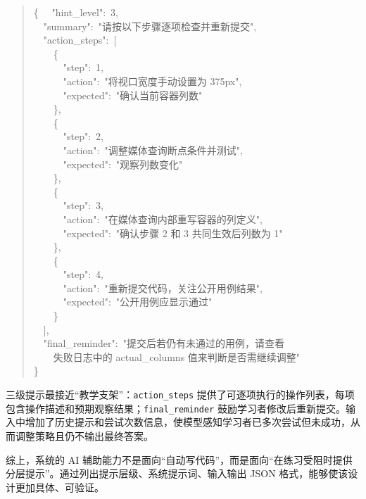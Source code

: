 \begin{appendices}
\begin{quote}\small\ttfamily
\{
\ \ "hint\_level":\ 3,\\
\ \ "summary":\ "请按以下步骤逐项检查并重新提交",\\
\ \ "action\_steps":\ [\\
\ \ \ \ \{\\
\ \ \ \ \ \ "step":\ 1,\\
\ \ \ \ \ \ "action":\ "将视口宽度手动设置为 375px",\\
\ \ \ \ \ \ "expected":\ "确认当前容器列数"\\
\ \ \ \ \},\\
\ \ \ \ \{\\
\ \ \ \ \ \ "step":\ 2,\\
\ \ \ \ \ \ "action":\ "调整媒体查询断点条件并测试",\\
\ \ \ \ \ \ "expected":\ "观察列数变化"\\
\ \ \ \ \},\\
\ \ \ \ \{\\
\ \ \ \ \ \ "step":\ 3,\\
\ \ \ \ \ \ "action":\ "在媒体查询内部重写容器的列定义",\\
\ \ \ \ \ \ "expected":\ "确认步骤 2 和 3 共同生效后列数为 1"\\
\ \ \ \ \},\\
\ \ \ \ \{\\
\ \ \ \ \ \ "step":\ 4,\\
\ \ \ \ \ \ "action":\ "重新提交代码，关注公开用例结果",\\
\ \ \ \ \ \ "expected":\ "公开用例应显示通过"\\
\ \ \ \ \}\\
\ \ ],\\
\ \ "final\_reminder":\ "提交后若仍有未通过的用例，请查看\\
\ \ \ \ 失败日志中的 actual\_columns 值来判断是否需继续调整"\\
\}
\end{quote}

三级提示最接近“教学支架”：\texttt{action\_steps} 提供了可逐项执行的操作列表，每项包含操作描述和预期观察结果；\texttt{final\_reminder} 鼓励学习者修改后重新提交。输入中增加了历史提示和尝试次数信息，使模型感知学习者已多次尝试但未成功，从而调整策略且仍不输出最终答案。

综上，系统的 AI 辅助能力不是面向“自动写代码”，而是面向“在练习受阻时提供分层提示”。通过列出提示层级、系统提示词、输入输出 JSON 格式，能够使该设计更加具体、可验证。


\end{appendices}
